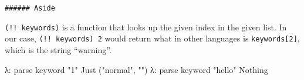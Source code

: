 \documentclass[]{article}
\newenvironment{Shaded}{}{}
\newcommand{\DataTypeTok}[1]{\textcolor[rgb]{0.56,0.13,0.00}{{#1}}}
\newcommand{\StringTok}[1]{\textcolor[rgb]{0.25,0.44,0.63}{{#1}}}
\newcommand{\OtherTok}[1]{\textcolor[rgb]{0.00,0.44,0.13}{{#1}}}
\newcommand{\FunctionTok}[1]{\textcolor[rgb]{0.02,0.16,0.49}{{#1}}}
\newcommand{\NormalTok}[1]{{#1}}
\begin{document}
\begin{Shaded}
\end{Shaded}

\begin{verbatim}
###### Aside
\end{verbatim}

\texttt{(!!\ keywords)} is a function that looks up the given index in the given list. In our case,
\texttt{(!!\ keywords)\ 2} would return what in other languages is \texttt{keywords{[}2{]}}, which
is the string ``warning''.

\begin{Shaded}
\begin{Highlighting}[]
\NormalTok{λ}\FunctionTok{:} \NormalTok{parse keyword }\StringTok{"1"}
\DataTypeTok{Just} \NormalTok{(}\StringTok{"normal"}\NormalTok{, }\StringTok{""}\NormalTok{)}
\NormalTok{λ}\FunctionTok{:} \NormalTok{parse keyword }\StringTok{"hello"}
\DataTypeTok{Nothing}
\end{Highlighting}
\end{Shaded}
\end{document}
